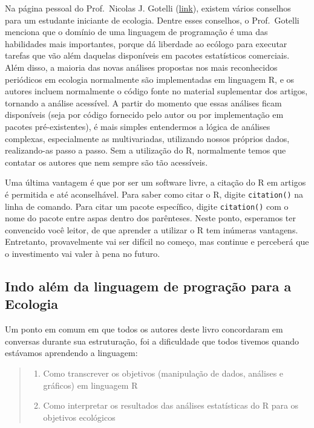 \documentclass[
]{article}
\providecommand{\tightlist}{%
  \setlength{\itemsep}{0pt}\setlength{\parskip}{0pt}}
\begin{document}
Na página pessoal do Prof.~Nicolas J. Gotelli (\href{http://www.uvm.edu/~ngotelli/homepage.html}{link}), existem vários conselhos para um estudante iniciante de ecologia. Dentre esses conselhos, o Prof.~Gotelli menciona que o domínio de uma linguagem de programação é uma das habilidades mais importantes, porque dá liberdade ao ecólogo para executar tarefas que vão além daquelas disponíveis em pacotes estatísticos comerciais. Além disso, a maioria das novas análises propostas nos mais reconhecidos periódicos em ecologia normalmente são implementadas em linguagem R, e os autores incluem normalmente o código fonte no material suplementar dos artigos, tornando a análise acessível. A partir do momento que essas análises ficam disponíveis (seja por código fornecido pelo autor ou por implementação em pacotes pré-existentes), é mais simples entendermos a lógica de análises complexas, especialmente as multivariadas, utilizando nossos próprios dados, realizando-as passo a passo. Sem a utilização do R, normalmente temos que contatar os autores que nem sempre são tão acessíveis.

Uma última vantagem é que por ser um software livre, a citação do R em artigos é permitida e até aconselhável. Para saber como citar o R, digite \texttt{citation()} na linha de comando. Para citar um pacote específico, digite \texttt{citation()} com o nome do pacote entre aspas dentro dos parênteses. Neste ponto, esperamos ter convencido você leitor, de que aprender a utilizar o R tem inúmeras vantagens. Entretanto, provavelmente vai ser difícil no começo, mas continue e perceberá que o investimento vai valer à pena no futuro.

\hypertarget{indo-aluxe9m-da-linguagem-de-prograuxe7uxe3o-para-a-ecologia}{%
\subsection{Indo além da linguagem de progração para a Ecologia}\label{indo-aluxe9m-da-linguagem-de-prograuxe7uxe3o-para-a-ecologia}}

Um ponto em comum em que todos os autores deste livro concordaram em conversas durante sua estruturação, foi a dificuldade que todos tivemos quando estávamos aprendendo a linguagem:

\begin{quote}
\begin{enumerate}
\def\labelenumi{\arabic{enumi}.}
\tightlist
\item
  Como transcrever os objetivos (manipulação de dados, análises e gráficos) em linguagem R
\item
  Como interpretar os resultados das análises estatísticas do R para os objetivos ecológicos
\end{enumerate}
\end{quote}
\end{document}
